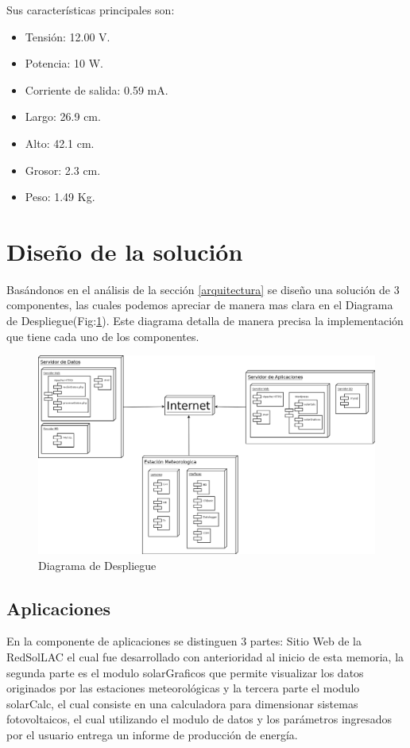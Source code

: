 Sus características principales son:\\

\begin{itemize}
\item Tensión: 12.00 V.
\item Potencia: 10 W.
\item Corriente de salida: 0.59 mA.
\item Largo: 26.9 cm.
\item Alto: 42.1 cm.
\item Grosor: 2.3 cm.
\item Peso: 1.49 Kg.
\end{itemize}

\section{Diseño de la solución}
Basándonos en el análisis de la sección \ref{arquitectura} se diseño una solución de 3 componentes, las cuales podemos apreciar de manera mas clara en el Diagrama de Despliegue(Fig:\ref{despliegue}). Este diagrama detalla de manera precisa la implementación que tiene cada uno de los componentes.\\

\begin{figure}[h!]
        \centering
        \includegraphics[scale=0.25]{images/despliegue}
        \caption{Diagrama de Despliegue}
	\label{despliegue} 
\end{figure}

\subsection{Aplicaciones}
En la componente de aplicaciones se distinguen 3 partes: Sitio Web de la RedSolLAC el cual fue desarrollado con anterioridad al inicio de esta memoria, la segunda parte es el modulo solarGraficos que permite visualizar los datos originados por las estaciones meteorológicas y la tercera parte el modulo solarCalc, el cual consiste en una calculadora para dimensionar sistemas fotovoltaicos, el cual utilizando el modulo de datos y los parámetros ingresados por el usuario entrega un informe de producción de energía.

